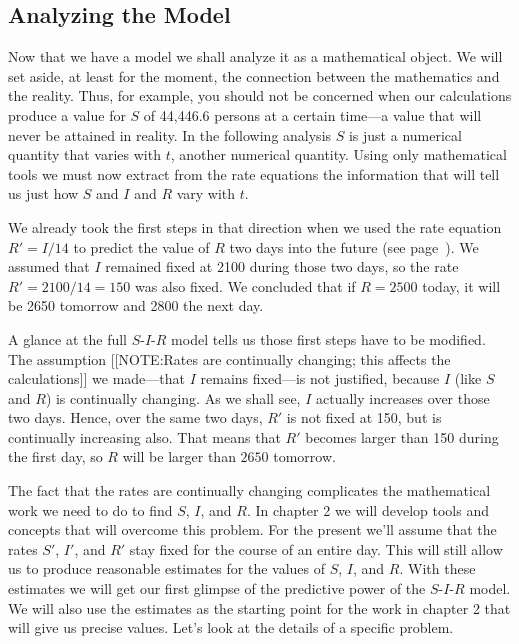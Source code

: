 \subsection{Analyzing the Model}
\label{subsec:analyzing-the-model}

Now that we have a model\label{`analyzestart'} we shall analyze it as
a mathematical object.  We will set aside, at least for the moment,
the connection between the mathematics and the reality.  Thus, for
example, you should not be concerned when our calculations produce a
value for $S$ of 44,446.6 persons at a certain time---a value that
will never be attained in reality.  In the following analysis $S$ is
just a numerical quantity that varies with $t$, another numerical
quantity.  Using only mathematical tools we must now extract from the
rate equations the information that will tell us just how $S$ and $I$
and $R$ vary with $t$.

We already took the first steps in that direction when we used the
rate equation $R' = I/14$ to predict the value of $R$ two days into
the future (see page~\pageref{`future'}).  We assumed that $I$
remained fixed at 2100 during those two days, so the rate $R' =
2100/14 = 150$ was also fixed.  We concluded that if $R = 2500$ today,
it will be 2650 tomorrow and 2800 the next day.

A glance at the full $S$-$I$-$R$ model tells us those first steps have
to be modified.  The assumption
[[NOTE:Rates are continually changing; this affects the calculations]]
we made---that $I$ remains fixed---is not justified, because $I$ (like
$S$ and $R$) is continually changing.  As we shall see, $I$ actually
increases over those two days.  Hence, over the same two days, $R'$ is
not fixed at 150, but is continually increasing also.  That means that
$R'$ becomes larger than 150 during the first day, so $R$ will be
larger than $2650$ tomorrow.

The fact that the rates are continually changing complicates the
mathematical work we need to do to find $S$, $I$, and $R$.  In chapter
2 we will develop tools and concepts that will overcome this problem.
For the present we'll assume that the rates $S'$, $I'$, and $R'$ stay
fixed for the course of an entire day.  This will still allow us to
produce reasonable estimates for the values of $S$,
$I$, and $R$.  With these estimates we will get our first glimpse of
the predictive power of the $S$-$I$-$R$ model.  We will also use the
estimates as the starting point for the work in chapter 2 that will
give us precise values.  Let's look at the details of a specific
problem.





